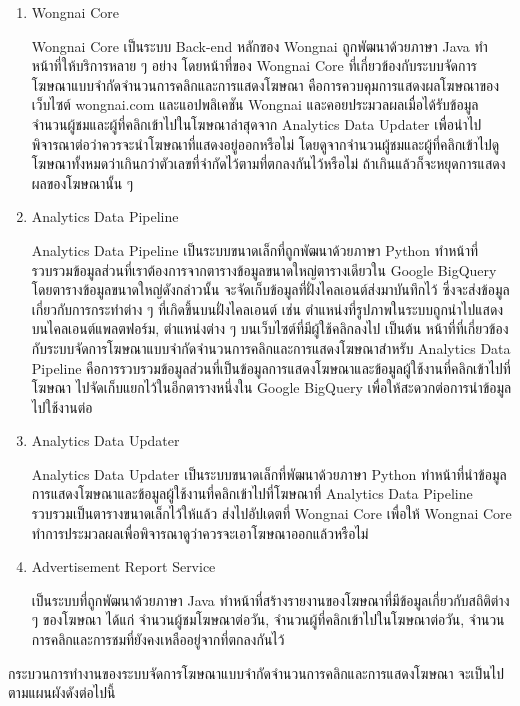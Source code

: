 \begin{enumerate}
	\item Wongnai Core
	
	Wongnai Core เป็นระบบ Back-end หลักของ Wongnai ถูกพัฒนาด้วยภาษา Java ทำหน้าที่ให้บริการหลาย ๆ อย่าง โดยหน้าที่ของ Wongnai Core ที่เกี่ยวข้องกับระบบจัดการโฆษณาแบบจำกัดจำนวนการคลิกและการแสดงโฆษณา คือการควบคุมการแสดงผลโฆษณาของเว็บไซต์ wongnai.com และแอปพลิเคชัน Wongnai และคอยประมวลผลเมื่อได้รับข้อมูลจำนวนผู้ชมและผู้ที่คลิกเข้าไปในโฆษณาล่าสุดจาก Analytics Data Updater เพื่อนำไปพิจารณาต่อว่าควรจะนำโฆษณาที่แสดงอยู่ออกหรือไม่ โดยดูจากจำนวนผู้ชมและผู้ที่คลิกเข้าไปดูโฆษณาทั้งหมดว่าเกินกว่าตัวเลขที่จำกัดไว้ตามที่ตกลงกันไว้หรือไม่ ถ้าเกินแล้วก็จะหยุดการแสดงผลของโฆษณานั้น ๆ
	
	\item Analytics Data Pipeline
	
	Analytics Data Pipeline เป็นระบบขนาดเล็กที่ถูกพัฒนาด้วยภาษา Python ทำหน้าที่รวบรวมข้อมูลส่วนที่เราต้องการจากตารางข้อมูลขนาดใหญ่ตารางเดียวใน Google BigQuery โดยตารางข้อมูลขนาดใหญ่ดังกล่าวนั้น จะจัดเก็บข้อมูลที่ฝั่งไคลเอนต์ส่งมาบันทึกไว้ ซึ่งจะส่งข้อมูลเกี่ยวกับการกระทำต่าง ๆ ที่เกิดขึ้นบนฝั่งไคลเอนต์ เช่น ตำแหน่งที่รูปภาพในระบบถูกนำไปแสดงบนไคลเอนต์แพลตฟอร์ม, ตำแหน่งต่าง ๆ บนเว็บไซต์ที่มีผู้ใช้คลิกลงไป เป็นต้น หน้าที่ที่เกี่ยวข้องกับระบบจัดการโฆษณาแบบจำกัดจำนวนการคลิกและการแสดงโฆษณาสำหรับ Analytics Data Pipeline คือการรวบรวมข้อมูลส่วนที่เป็นข้อมูลการแสดงโฆษณาและข้อมูลผู้ใช้งานที่คลิกเข้าไปที่โฆษณา ไปจัดเก็บแยกไว้ในอีกตารางหนึ่งใน Google BigQuery เพื่อให้สะดวกต่อการนำข้อมูลไปใช้งานต่อ
	
	\item Analytics Data Updater
	
	Analytics Data Updater เป็นระบบขนาดเล็กที่พัฒนาด้วยภาษา Python ทำหน้าที่นำข้อมูลการแสดงโฆษณาและข้อมูลผู้ใช้งานที่คลิกเข้าไปที่โฆษณาที่ Analytics Data Pipeline รวบรวมเป็นตารางขนาดเล็กไว้ให้แล้ว ส่งไปอัปเดตที่ Wongnai Core เพื่อให้ Wongnai Core ทำการประมวลผลเพื่อพิจารณาดูว่าควรจะเอาโฆษณาออกแล้วหรือไม่
	
	\item Advertisement Report Service
	
	เป็นระบบที่ถูกพัฒนาด้วยภาษา Java ทำหน้าที่สร้างรายงานของโฆษณาที่มีข้อมูลเกี่ยวกับสถิติต่าง ๆ ของโฆษณา ได้แก่ จำนวนผู้ชมโฆษณาต่อวัน, จำนวนผู้ที่คลิกเข้าไปในโฆษณาต่อวัน, จำนวนการคลิกและการชมที่ยังคงเหลืออยู่จากที่ตกลงกันไว้
\end{enumerate}

กระบวนการทำงานของระบบจัดการโฆษณาแบบจำกัดจำนวนการคลิกและการแสดงโฆษณา จะเป็นไปตามแผนผังดังต่อไปนี้

